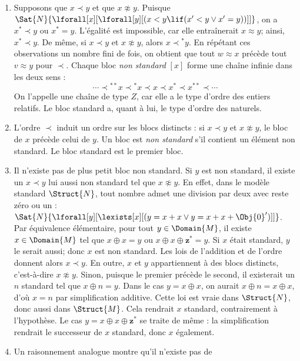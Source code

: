 \documentclass[../../../include/open-logic-section]{subfiles}
\begin{document}
\begin{enumerate}
  alors $n \approx m$. Le \emph{bloc} de $x$ est sa classe
  d'équivalence $[x] = \Setabs{y}{x \approx y}$.
\item Supposons que $x \prec y$ et que $x \not\approx y$. Puisque
  $\Sat{N}{\lforall[x][\lforall[y][(x < y \lif (x' < y \lor x' =
      y))]]}$, on a $x^* \prec y$ ou $x^* = y$. L'égalité est
  impossible, car elle entraînerait $x \approx y$; ainsi,
  $x^* \prec y$. De même, si $x \prec y$ et $x \not\approx y$,
  alors $x \prec {^*y}$.
  En répétant ces observations un nombre fini de fois, on obtient
  que tout $w \approx x$ précède tout $v \approx y$ pour $\prec$.
  Chaque bloc \emph{non standard} $[x]$ forme une chaîne infinie
  dans les deux sens :
  \[
  \cdots \prec  {^{**}x} \prec {^*}x \prec x \prec x^* \prec x^{**}
  \prec \cdots
  \]
  On l'appelle une chaîne de type $Z$, car elle a le type d'ordre
  des entiers relatifs. Le bloc standard a, quant à lui, le type
  d'ordre des naturels.
\item L'ordre $\prec$ induit un ordre sur les blocs distincts :
  si $x \prec y$ et $x \not\approx y$, le bloc de $x$ précède
  celui de $y$. Un bloc est \emph{non standard} s'il contient
  un élément non standard. Le bloc standard est le premier bloc.
\item Il n'existe pas de plus petit bloc non standard. Si $y$ est
  non standard, il existe un $x \prec y$ lui aussi non standard
  tel que $x \not\approx y$. En effet, dans le modèle standard
  $\Struct{N}$, tout nombre admet une division par deux avec reste
  zéro ou un :
  $\Sat{N}{\lforall[y][\lexists[x][(y = x + x \lor y = x + x +
        \Obj{0}')]]}$.
  Par équivalence élémentaire, pour tout $y \in \Domain{M}$,
  il existe $x \in \Domain{M}$ tel que $x \oplus x = y$ ou
  $x \oplus x \oplus \mathbf{z}^*= y$.
  Si $x$ était standard, $y$ le serait aussi; donc $x$ est
  non standard. Les lois de l'addition et de l'ordre donnent
  alors $x \prec y$.
  En outre, $x$ et $y$ appartiennent à des blocs distincts,
  c'est-à-dire $x \not\approx y$.
  Sinon, puisque le premier précède le second, il existerait un
  $n$ standard tel que $x \oplus n = y$.
  Dans le cas $y = x \oplus x$, on aurait
  $x \oplus n = x \oplus x$, d'où $x = n$ par simplification
  additive. Cette loi est vraie dans $\Struct{N}$, donc aussi
  dans $\Struct{M}$. Cela rendrait $x$ standard, contrairement
  à l'hypothèse. Le cas $y = x \oplus x \oplus \mathbf{z}^*$
  se traite de même : la simplification rendrait le successeur
  de $x$ standard, donc $x$ également.
\item Un raisonnement analogue montre qu'il n'existe pas de

\end{enumerate}
\end{document}
